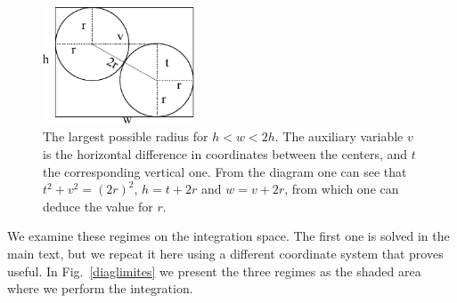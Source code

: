 \documentclass[superscriptaddress,pre,reprint,showpacs,twocolumn]{revtex4-1}
\begin{document}
\begin{figure}[h]
  \centering
  \includegraphics[width=0.4\textwidth]{figures/DiagramaRadioMaximo.pdf}
  \caption{The largest possible radius for $h<w<2h$. The auxiliary variable
    $v$ is the horizontal difference in coordinates between the centers,
    and $t$ the corresponding vertical one.
    From the diagram
    one can see that $t^2+v^2=(2r)^2$, $h=t+2r$ and $w=v+2r$, from which
    one can deduce the value for $r$.}
  \label{radiomaximo}
\end{figure}

We examine these regimes on the integration space. The first one is solved
in the main text, but we repeat it here using a different coordinate system
that proves useful. In Fig.~\ref{diaglimites} we present the three regimes as
the shaded area where we perform the integration. 
  
\end{document}
